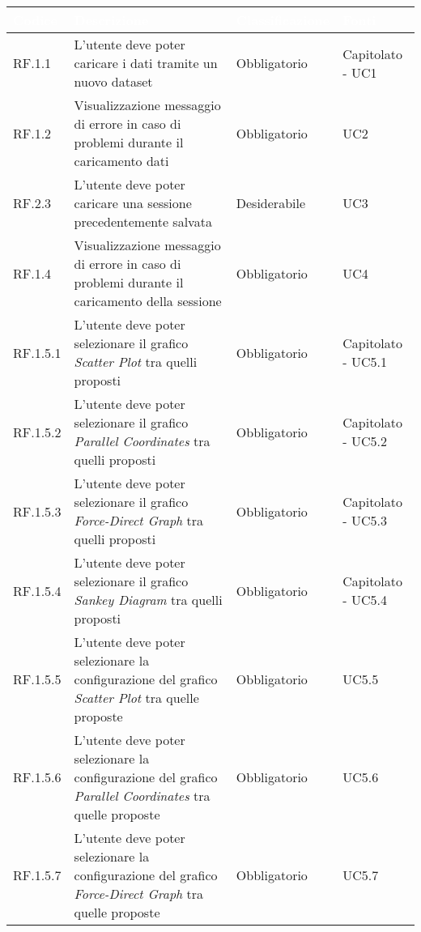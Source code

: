 \begin{center}
  \centering
  \begin{longtable}{|L{1,5cm}|C{5,5cm}|C{3cm}|C{2cm}|}
    \hline
    \textcolor[HTML]{FFFFFF}{\textbf{Codice}} & \textcolor[HTML]{FFFFFF}{\textbf{Descrizione}} & \textcolor[HTML]{FFFFFF}{\textbf{Classificazione}} & \textcolor[HTML]{FFFFFF}{\textbf{Fonti}}
    \\ \hline
    RF.1.1 & L'utente deve poter caricare i dati tramite un nuovo dataset & Obbligatorio & Capitolato - UC1 \\ \hline
    RF.1.2 & Visualizzazione messaggio di errore in caso di problemi durante il caricamento dati & Obbligatorio & UC2 \\ \hline
    RF.2.3 & L'utente deve poter caricare una sessione precedentemente salvata & Desiderabile & UC3 \\ \hline
    RF.1.4 & Visualizzazione messaggio di errore in caso di problemi durante il caricamento della sessione & Obbligatorio & UC4 \\ \hline
    RF.1.5.1 & L'utente deve poter selezionare il grafico \textit{Scatter Plot} tra quelli proposti& Obbligatorio & Capitolato - UC5.1 \\ \hline
    RF.1.5.2 & L'utente deve poter selezionare il grafico \textit{Parallel Coordinates} tra quelli proposti& Obbligatorio & Capitolato - UC5.2 \\ \hline
    RF.1.5.3 & L'utente deve poter selezionare il grafico \textit{Force-Direct Graph} tra quelli proposti& Obbligatorio & Capitolato - UC5.3 \\ \hline
    RF.1.5.4 & L'utente deve poter selezionare il grafico \textit{Sankey Diagram} tra quelli proposti& Obbligatorio & Capitolato - UC5.4 \\ \hline
    RF.1.5.5 & L'utente deve poter selezionare la configurazione del grafico \textit{Scatter Plot} tra quelle proposte& Obbligatorio & UC5.5 \\ \hline
    RF.1.5.6 & L'utente deve poter selezionare la configurazione del grafico \textit{Parallel Coordinates} tra quelle proposte& Obbligatorio & UC5.6 \\ \hline
    RF.1.5.7 & L'utente deve poter selezionare la configurazione del grafico \textit{Force-Direct Graph} tra quelle proposte& Obbligatorio & UC5.7 \\ \hline

\end{longtable}
\end{center}
